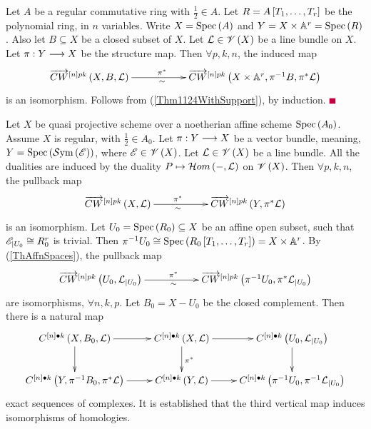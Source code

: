 \documentclass[12pt]{article}
\begin{document}
\bT\label{ThAffnSpaces}{\rm 
Let $A$ be a regular commutative ring with $\frac{1}{2}\in A$. Let  $R=A\left[ T_1, \ldots, T_r\right]$ be the polynomial ring, in $n$ variables. Write $X=\mathrm{Spec}\left(A\right)$ and 
$Y=X\times {\mathbb{A}}^r=\mathrm{Spec}\left(R\right)$. Also let $B\subseteq X$ be a closed subset of $X$. Let ${\mathcal{L}}\in {\mathscr {V}}\left( X\right)$
be a line bundle on $X$.  
Let $\pi: Y \longrightarrow X$ be the structure map. Then $\forall p, k, n$, the induced map
$$
\diagram 
\ora{CW}^{\LRt{n}pk} \LRf{X, B, {\CL}} \ar[rr]^{\pi^*\qquad}_{\sim\qquad} && \ora{CW}^{\LRt{n}pk}\LRf{X\times {\BA}^r, \pi^{-1}B, \pi^*{\CL}} \\
\enddiagram 
$$
is  an isomorphism.  
}
\eT
\pf Follows from (\ref{Thm1124WithSupport}), by induction. $\eop$

\bT\label{VectorBunCW}{\rm 
Let $X$ be quasi projective scheme over a noetherian affine scheme $\mathrm{Spec}\left(A_0\right)$. Assume   $X$ is regular,
with $\frac{1}{2}\in A_0$.  Let 
$\pi: Y \longrightarrow X$ be a vector bundle, meaning, $Y=\mathrm{Spec}\left({\mathcal{S}}\mathrm{ym}\left({\mathscr {E}}\right)\right)$, where ${\mathscr {E}}\in {\mathscr {V}}\left( X\right)$. 
Let ${\mathcal{L}}\in {\mathscr {V}}\left( X\right)$ be a line bundle. All the dualities are induced by the duality $P \mapsto {\mathcal{H}}om\left( -, {\mathcal{L}}\right)$ on ${\mathscr {V}}\left( X\right)$.
 Then $\forall p, k, n$, the pullback map
$$
\diagram 
\ora{CW}^{\LRt{n}pk} \LRf{X,  {\CL}} \ar[rr]^{\pi^*\quad}_{\sim\quad} && \ora{CW}^{\LRt{n}pk}\LRf{Y,  \pi^*{\CL}} \\
\enddiagram 
$$
is  an isomorphism.  
}
\eT
\pf Let $U_0=\mathrm{Spec}\left(R_0\right) \subseteq X$ be an affine open subset, such that ${\mathscr {E}}_{|U_0}\cong R_0^r$ is trivial. 
Then $\pi^{-1}U_0\cong \mathrm{Spec}\left(R_0\left[ T_1, \ldots, T_r\right]\right)=X\times {\mathbb{A}}^r$. By (\ref{ThAffnSpaces}), the pullback map 
$$
\diagram 
\ora{CW}^{\LRt{n}pk} \LRf{U_0,  {\CL}_{|{U_0}}} \ar[rr]^{\pi^*\quad}_{\sim\quad} && \ora{CW}^{\LRt{n}pk}\LRf{\pi^{-1}U_0,  \pi^*{\CL}_{|U_0}} \\
\enddiagram 
$$
are isomorphisms, $\forall n, k, p$. Let $B_0=X-U_0$ be the closed complement. Then there is a natural map
$$
\diagram 
C^{\LRt{n}{\bul}k}\LRf{X, B_0, {\CL}} \ar[r] \ar[d]& C^{\LRt{n}{\bul}k}\LRf{X, {\CL}} \ar[r] \ar[d]^{\pi^*}& C^{\LRt{n}{\bul}k}\LRf{U_0, {\CL}_{|U_0}}\ar[d]\\
C^{\LRt{n}{\bul}k}\LRf{Y, \pi^{-1}B_0, \pi^*{\CL}} \ar[r] & C^{\LRt{n}{\bul}k}\LRf{Y, {\CL}} \ar[r] & C^{\LRt{n}{\bul}k}\LRf{\pi^{-1}U_0, \pi^{-1}{\CL}_{|U_0}}\\
\enddiagram 
$$
exact sequences of complexes. 
It is established that the third vertical map induces isomorphisms of homologies.
\end{document}
